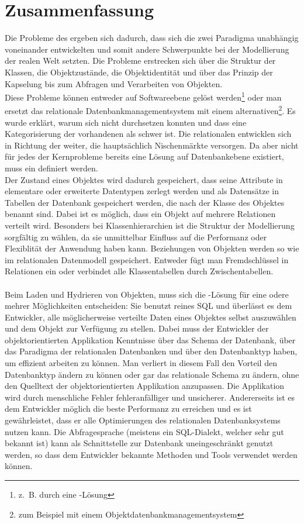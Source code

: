 \chapter{Zusammenfassung}

Die Probleme des \IM ergeben sich dadurch, dass sich die zwei Paradigma unabhängig voneinander entwickelten und somit andere Schwerpunkte bei der Modellierung der realen Welt setzten. Die Probleme erstrecken sich über die Struktur der Klassen, die Objektzustände, die Objektidentität und über das Prinzip der Kapselung bis zum Abfragen und Verarbeiten von Objekten. \\
Diese Probleme können entweder auf Softwareebene gelöst werden\footnote{z.~B. durch eine \ORM-Lösung} oder man ersetzt das relationale Datenbankmanagementsystem mit einem alternativen\footnote{zum Beispiel mit einem Objektdatenbankmanagementsystem}. Es wurde erklärt, warum sich \OODBMS nicht durchsetzen konnten und dass eine Kategorisierung der vorhandenen \DBMS als \ORDBMS schwer ist. Die relationalen \DBMS entwicklen sich in Richtung der \OODBMS weiter, die hauptsächlich Nischenmärkte versorgen. Da aber nicht für jedes der Kernprobleme bereits eine Lösung auf Datenbankebene existiert, muss ein  definiert werden. \\
Der Zustand eines Objektes wird dadurch gespeichert, dass seine Attribute in elementare oder erweiterte Datentypen zerlegt werden und als Datensätze in Tabellen der Datenbank gespeichert werden, die nach der Klasse des Objektes benannt sind. Dabei ist es möglich, dass ein Objekt auf mehrere Relationen verteilt wird. Besonders bei Klassenhierarchien ist die Struktur der Modellierung sorgfältig zu wählen, da sie unmittelbar Einfluss auf die Performanz oder Flexiblität der Anwendung haben kann. Beziehungen von Objekten werden so wie im relationalen Datenmodell gespeichert. Entweder fügt man Fremdschlüssel in Relationen ein oder verbindet alle Klassentabellen durch Zwischentabellen. \\
\\
Beim Laden und Hydrieren von Objekten, muss sich die \ORM-Lösung für eine odere mehrer Möglichkeiten entscheiden: Sie benutzt reines SQL und überlässt es dem Entwickler, alle möglicherweise verteilte Daten eines Objektes selbst auszuwählen und dem Objekt zur Verfügung zu stellen. Dabei muss der Entwickler der objektorientierten Applikation Kenntnisse über das Schema der Datenbank, über das Paradigma der relationalen Datenbanken und über den Datenbanktyp haben, um effizient arbeiten zu können. Man verliert in diesem Fall den Vorteil den Datenbanktyp ändern zu können oder gar das relationale Schema zu ändern, ohne den Quelltext der objektorientierten Applikation anzupassen. Die Applikation wird durch menschliche Fehler fehleranfälliger und unsicherer. Andererseits ist es dem Entwickler möglich die beste Performanz zu erreichen und es ist gewährleistet, dass er alle Optimierungen des relationalen Datenbanksystems nutzen kann. Die Abfragesprache (meistens ein SQL-Dialekt, welcher sehr gut bekannt ist) kann als Schnittstelle zur Datenbank uneingeschränkt genutzt werden, so dass dem Entwickler bekannte Methoden und Tools verwendet werden können. \\
